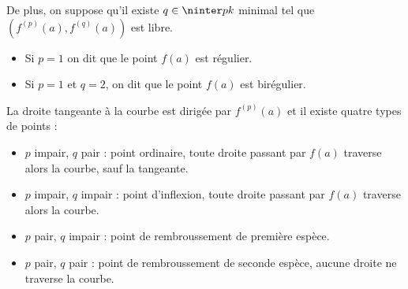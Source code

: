 De plus, on suppose qu'il existe $q \in \ninter p k$ minimal tel que $\left( f^{(p)}(a), f^{(q)}(a) \right)$ 
est libre.

\begin{itemize}
    \item Si $p = 1$ on dit que le point $f(a)$ est régulier. 
    \item Si $p = 1$ et $q = 2$, on dit que le point $f(a)$ est birégulier. 
\end{itemize}


La droite tangeante à la courbe est dirigée par $f^{(p)}(a)$ et 
il existe quatre types de points : 
\begin{itemize}
    \item $p$ impair, $q$ pair : point ordinaire, toute droite passant par $f(a)$ traverse alors la courbe, sauf la tangeante.
    \item $p$ impair, $q$ impair : point d'inflexion, toute droite passant par $f(a)$ traverse alors la courbe. 
    \item $p$ pair, $q$ impair : point de rembroussement de première espèce. 
    \item $p$ pair, $q$ pair : point de rembroussement de seconde espèce, aucune droite ne traverse la courbe.
\end{itemize}

